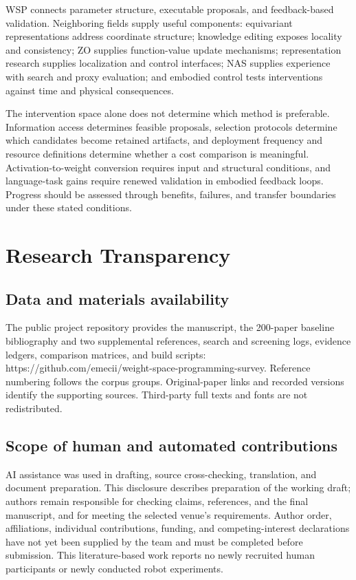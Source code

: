 WSP connects parameter structure, executable proposals, and feedback-based validation. Neighboring fields supply useful components: equivariant representations address coordinate structure; knowledge editing exposes locality and consistency; ZO supplies function-value update mechanisms; representation research supplies localization and control interfaces; NAS supplies experience with search and proxy evaluation; and embodied control tests interventions against time and physical consequences.


The intervention space alone does not determine which method is preferable. Information access determines feasible proposals, selection protocols determine which candidates become retained artifacts, and deployment frequency and resource definitions determine whether a cost comparison is meaningful. Activation-to-weight conversion requires input and structural conditions, and language-task gains require renewed validation in embodied feedback loops. Progress should be assessed through benefits, failures, and transfer boundaries under these stated conditions.


\section*{Research Transparency}

\subsection*{Data and materials availability}

The public project repository provides the manuscript, the 200-paper baseline bibliography and two supplemental references, search and screening logs, evidence ledgers, comparison matrices, and build scripts: https://github.com/emecii/weight-space-programming-survey. Reference numbering follows the corpus groups. Original-paper links and recorded versions identify the supporting sources. Third-party full texts and fonts are not redistributed.


\subsection*{Scope of human and automated contributions}

AI assistance was used in drafting, source cross-checking, translation, and document preparation. This disclosure describes preparation of the working draft; authors remain responsible for checking claims, references, and the final manuscript, and for meeting the selected venue's requirements. Author order, affiliations, individual contributions, funding, and competing-interest declarations have not yet been supplied by the team and must be completed before submission. This literature-based work reports no newly recruited human participants or newly conducted robot experiments.
